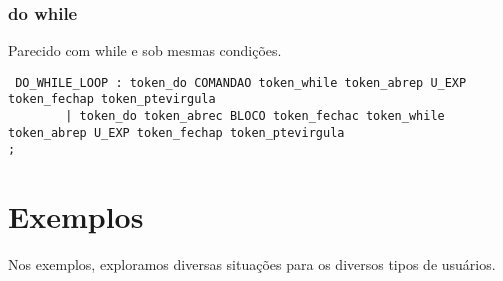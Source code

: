 \documentclass[a4paper,10pt]{article}
\begin{document}
\subsubsection{do while}

Parecido com while e sob mesmas condições.

\begin{verbatim}
 DO_WHILE_LOOP : token_do COMANDAO token_while token_abrep U_EXP token_fechap token_ptevirgula
		| token_do token_abrec BLOCO token_fechac token_while token_abrep U_EXP token_fechap token_ptevirgula
;

\end{verbatim}

\section{Exemplos}
Nos exemplos, exploramos diversas situações para os diversos tipos de usuários.
\end{document}
